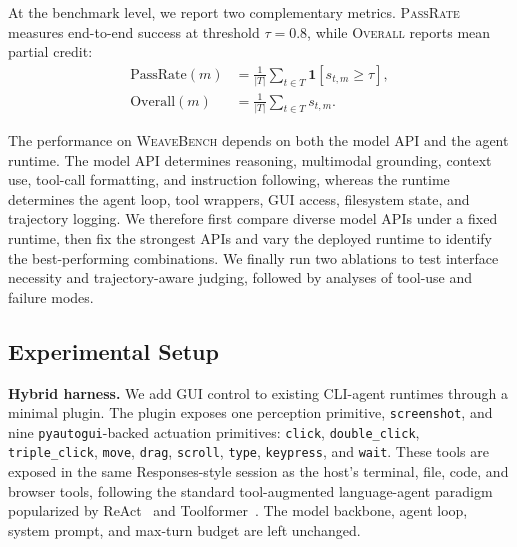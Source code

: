 \documentclass{llmxive}
\providecommand{\section}[1]{  \oldappendixsection{#1}  \setcounter{table}{0}  \setcounter{figure}{0}}
\begin{document}
At the benchmark level, we report two complementary metrics. \textsc{PassRate} measures end-to-end success at threshold $\tau=0.8$, while \textsc{Overall} reports mean partial credit:
\begin{equation}
\begin{aligned}
\mathrm{PassRate}(m)&=\frac{1}{|T|}\sum_{t\in T}\mathbf{1}[s_{t,m}\geq \tau], \\
\mathrm{Overall}(m)&=\frac{1}{|T|}\sum_{t\in T}s_{t,m}.
\end{aligned}
\end{equation}

\section{Experiments}
\label{sec:experiments}

The performance on \textsc{WeaveBench} depends on both the model API and the agent runtime. The model API determines reasoning, multimodal grounding, context use, tool-call formatting, and instruction following, whereas the runtime determines the agent loop, tool wrappers, GUI access, filesystem state, and trajectory logging. We therefore first compare diverse model APIs under a fixed runtime, then fix the strongest APIs and vary the deployed runtime to identify the best-performing combinations. We finally run two ablations to test interface necessity and trajectory-aware judging, followed by analyses of tool-use and failure modes.

\subsection{Experimental Setup}
\label{sec:experimental-setup}

\noindent\textbf{Hybrid harness.}\label{sec:protocol-runtime}
We add GUI control to existing CLI-agent runtimes through a minimal plugin. The plugin exposes one perception primitive, \texttt{screenshot}, and nine \texttt{pyautogui}-backed actuation primitives: \texttt{click}, \texttt{double\_click}, \texttt{triple\_click}, \texttt{move}, \texttt{drag}, \texttt{scroll}, \texttt{type}, \texttt{keypress}, and \texttt{wait}. These tools are exposed in the same Responses-style session as the host's terminal, file, code, and browser tools, following the standard tool-augmented language-agent paradigm popularized by ReAct~\citep{yao2022react} and Toolformer~\citep{schick2023toolformer}. The model backbone, agent loop, system prompt, and max-turn budget are left unchanged.
\end{document}
